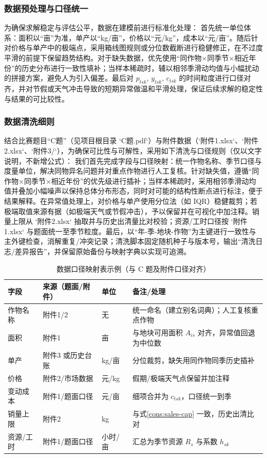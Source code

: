 \subsubsection{数据预处理与口径统一}
为确保求解稳定与评估公平，数据在建模前进行标准化处理：
首先统一单位体系：面积以“亩”为准，单产以“kg/亩”，价格以“元/kg”，成本以“元/亩”。随后针对价格与单产中的极端点，采用箱线图规则或分位数截断进行稳健修正，在不过度平滑的前提下保留趋势结构。对于缺失数据，优先使用“同作物×同季节×相近年份”的历史分布进行一致性填补；当样本稀疏时，辅以相邻季滑动均值与小幅扰动的拼接方案，避免人为引入偏差。最后对 $p_{tsk},\,y_{tsk},\,c_{tsk}$ 的时间粒度进行口径对齐，并对节假或天气冲击导致的短期异常做温和平滑处理，保证后续求解的稳定性与结果的可比较性。


\subsubsection{数据清洗细则}
结合比赛题目“C题”（见项目根目录 `C题.pdf`）与附件数据（`附件1.xlsx`、`附件2.xlsx`、`附件3/`），为确保可比性与可解性，采用如下清洗与口径规则（仅以文字说明，不新增公式）：
我们首先完成字段与口径映射：统一作物名称、季节口径与度量单位，解决同物异名问题并对重点作物进行人工复核。针对缺失值，遵循“同作物×同季节×相近年份”的优先级进行插补；当样本稀疏时，采用相邻季滑动均值并叠加小幅噪声以保持总体分布形态，同时对可能的结构性断点进行标注，便于结果解释。在异常值处理上，对价格与单产使用分位法（如 IQR）稳健裁剪；若极端取值来源有据（如极端天气或节假冲击），予以保留并在可视化中加注释。销量上限从 `附件2.xlsx` 抽取并与历史出清量比对校验；资源/工时口径按 `附件1.xlsx` 与题面统一至季节粒度。最后，以“年-季-地块-作物”为主键进行一致性与主外键检查，消解重复/冲突记录；清洗脚本固定随机种子与版本号，输出“清洗日志/差异报告”，并保留原始备份与映射字典以实现可追溯。

\begin{table}[H]
  \centering
  \caption{数据口径映射表示例（与 C 题及附件口径对齐）}\label{tab:schema-mapping}
  \begin{tabular}{@{}l >{\raggedright\arraybackslash}p{3.5cm} l >{\raggedright\arraybackslash}p{5.8cm}@{}}
    \toprule
    字段 & 来源（题面/附件） & 单位 & 备注/处理 \\
    \midrule
    作物名称 & 附件1/2 & 无 & 统一命名（建立别名词典）；人工复核重点作物 \\
    面积 & 附件1 & 亩 & 与地块可用面积 $A_{is}$ 对齐，异常值回退为中位数 \\
    单产 & 附件3 或历史台账 & kg/亩 & 分位裁剪，缺失用同作物同季历史插补 \\
    价格 & 附件2/市场数据 & 元/kg & 假期/极端天气点保留并加注释 \\
    变动成本 & 附件1/题面口径 & 元/亩 & 细项合并为 $c_{tsk}$，口径统一到季 \\
    销量上限 & 附件2 & kg & 与式\eqref{cons:sales-cap} 一致，历史出清比对 \\
    资源/工时 & 附件1/题面口径 & 小时/亩 & 汇总为季节资源 $R_s$ 与系数 $h_{sk}$ \\
    \bottomrule
  \end{tabular}
\end{table}

